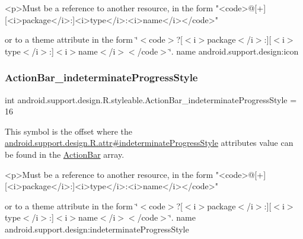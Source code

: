 \begin{DoxyVerb}      <p>Must be a reference to another resource, in the form "<code>@[+][<i>package</i>:]<i>type</i>:<i>name</i></code>"
\end{DoxyVerb}
 or to a theme attribute in the form \char`\"{}$<$code$>$?\mbox{[}$<$i$>$package$<$/i$>$\+:\mbox{]}\mbox{[}$<$i$>$type$<$/i$>$\+:\mbox{]}$<$i$>$name$<$/i$>$$<$/code$>$\char`\"{}.  name android.\+support.\+design\+:icon \mbox{\label{classandroid_1_1support_1_1design_1_1R_1_1styleable_aaaf61ddc78cf22a50998e89590c52198}} 
\subsubsection{\texorpdfstring{Action\+Bar\+\_\+indeterminate\+Progress\+Style}{ActionBar\_indeterminateProgressStyle}}
{\footnotesize\ttfamily int android.\+support.\+design.\+R.\+styleable.\+Action\+Bar\+\_\+indeterminate\+Progress\+Style = 16\hspace{0.3cm}{\ttfamily [static]}}

This symbol is the offset where the \hyperlink{classandroid_1_1support_1_1design_1_1R_1_1attr_a8b45873d94fc96a0aa003380408c6b79}{android.\+support.\+design.\+R.\+attr\#indeterminate\+Progress\+Style} attribute\textquotesingle{}s value can be found in the \hyperlink{classandroid_1_1support_1_1design_1_1R_1_1styleable_ab795220a96557d11f8c21359b95bed82}{Action\+Bar} array.

\begin{DoxyVerb}      <p>Must be a reference to another resource, in the form "<code>@[+][<i>package</i>:]<i>type</i>:<i>name</i></code>"
\end{DoxyVerb}
 or to a theme attribute in the form \char`\"{}$<$code$>$?\mbox{[}$<$i$>$package$<$/i$>$\+:\mbox{]}\mbox{[}$<$i$>$type$<$/i$>$\+:\mbox{]}$<$i$>$name$<$/i$>$$<$/code$>$\char`\"{}.  name android.\+support.\+design\+:indeterminate\+Progress\+Style \mbox{\label{classandroid_1_1support_1_1design_1_1R_1_1styleable_a78fa3cd1aaa0862234ec9dbe574b9ec8}} 
